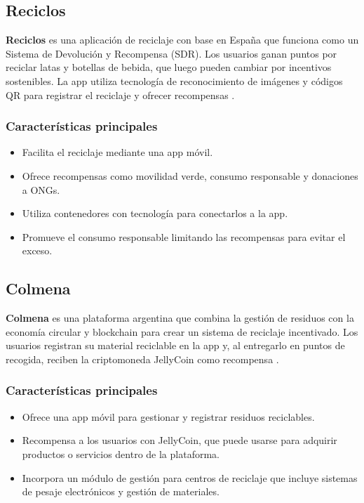\documentclass[main.tex]{subfiles}
\begin{document}
\subsection{Reciclos}
\textbf{Reciclos} es una aplicación de reciclaje con base en España que funciona como un Sistema de Devolución y Recompensa (SDR). Los usuarios ganan puntos por reciclar latas y botellas de bebida, que luego pueden cambiar por incentivos sostenibles. La app utiliza tecnología de reconocimiento de imágenes y códigos QR para registrar el reciclaje y ofrecer recompensas \cite{reciclos2024}.

\subsubsection*{Características principales}
\begin{itemize}
    \item Facilita el reciclaje mediante una app móvil.
    \item Ofrece recompensas como movilidad verde, consumo responsable y donaciones a ONGs.
    \item Utiliza contenedores con tecnología para conectarlos a la app.
    \item Promueve el consumo responsable limitando las recompensas para evitar el exceso.
\end{itemize}

\subsection{Colmena}
\textbf{Colmena} es una plataforma argentina que combina la gestión de residuos con la economía circular y blockchain para crear un sistema de reciclaje incentivado. Los usuarios registran su material reciclable en la app y, al entregarlo en puntos de recogida, reciben la criptomoneda JellyCoin como recompensa \cite{colmena2024}.

\subsubsection*{Características principales}
\begin{itemize}
    \item Ofrece una app móvil para gestionar y registrar residuos reciclables.
    \item Recompensa a los usuarios con JellyCoin, que puede usarse para adquirir productos o servicios dentro de la plataforma.
    \item Incorpora un módulo de gestión para centros de reciclaje que incluye sistemas de pesaje electrónicos y gestión de materiales.
\end{itemize}
\end{document}
